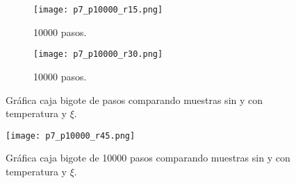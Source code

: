 \documentclass{article}
\begin{document}
\begin{figure}[H]
\centering
\begin{subfigure}[b]{0.40\linewidth}
\texttt{[image: p7\_p10000\_r15.png]}
\caption{10000 pasos.}
\end{subfigure}
\begin{subfigure}[b]{0.40\linewidth}
\texttt{[image: p7\_p10000\_r30.png]}
\caption{10000 pasos.}
\end{subfigure}
\caption{Gráfica caja bigote de pasos comparando muestras sin y con temperatura y $\xi$.}
\label{fig:westminster}
\end{figure}

\begin{figure}[H]
\centering
\texttt{[image: p7\_p10000\_r45.png]}
\caption{\label{fig3} Gráfica caja bigote de 10000 pasos comparando muestras sin y con temperatura y $\xi$.}
\end{figure}


\printbibliography
\end{document}
